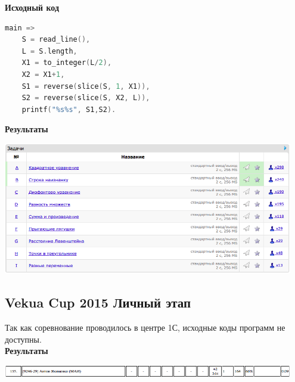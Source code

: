 \documentclass[a4paper,12pt]{article}
\begin{document}
\textbf{{\large Исходный код}}
\begin{lstlisting}[language=C]
main =>
    S = read_line(),
    L = S.length,
    X1 = to_integer(L/2),
    X2 = X1+1,
    S1 = reverse(slice(S, 1, X1)),
    S2 = reverse(slice(S, X2, L)),
    printf("%s%s", S1,S2).
\end{lstlisting}

\newpage
\textbf{{\large Результаты}} \\
\begin{center}
\includegraphics[width=0.95\textwidth]{VK_1/A_VK_1_result.png}\\ [1cm]
\end{center}



%
%
\newpage
\subsection{Vekua Cup 2015 Личный этап}

Так как соревнование проводилось в центре 1С, исходные коды программ не доступны. \\

\textbf{{\large Результаты}} \\
\begin{center}
\includegraphics[width=0.95\textwidth]{Vekua_personal/A_Vekua_personal_result.png}\\ [1cm]
\end{center}
\end{document}
